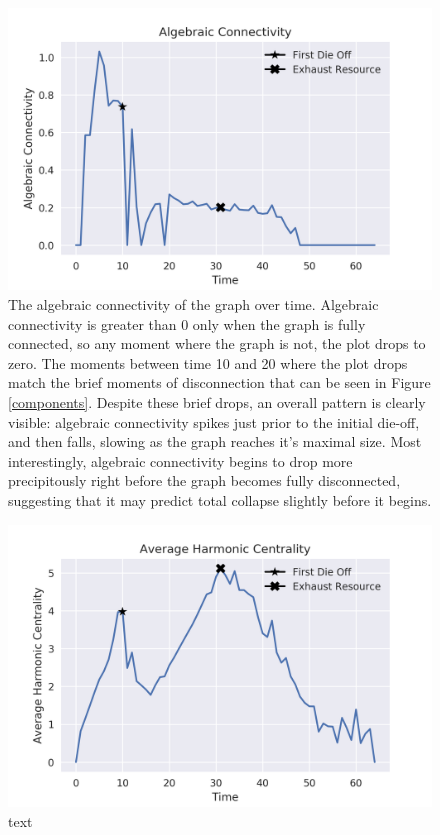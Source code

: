 \documentclass{paper}
\begin{document}
	\begin{figure}[h]
		\centering
		\includegraphics[scale=0.75]{alg_conn.png}
		\caption{The algebraic connectivity of the graph over time. Algebraic connectivity is greater than 0 only when the graph is fully connected, so any moment where the graph is not, the plot drops to zero. The moments between time 10 and 20 where the plot drops match the brief moments of disconnection that can be seen in Figure \ref{components}. Despite these brief drops, an overall pattern is clearly visible: algebraic connectivity spikes just prior to the initial die-off, and then falls, slowing as the graph reaches it's maximal size. Most interestingly, algebraic connectivity begins to drop more precipitously right before the graph becomes fully disconnected, suggesting that it may predict total collapse slightly before it begins.}
		\label{alg-conn}
	\end{figure}
	
	\begin{figure}[h]
		\centering
		\includegraphics[scale=0.75]{harmonic_centrality.png}
		\caption{text}
		\label{harmonic}
	\end{figure}
	
\end{document}
